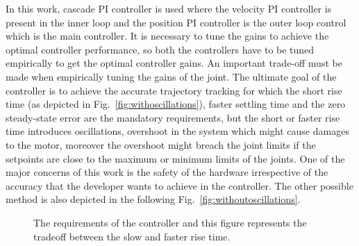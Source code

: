 In this work, cascade PI controller is used where the velocity PI controller is present in the inner loop and the position PI controller is the outer loop control which is the main controller. It is necessary to tune the gains to achieve the optimal controller performance, so both the controllers have to be tuned empirically to get the optimal controller gains. An important trade-off must be made when empirically tuning the gains of the joint. The ultimate goal of the controller is to achieve the accurate trajectory tracking for which the short rise time (as depicted in Fig.~\ref{fig:withoscillations}), faster settling time and the zero steady-state error are the mandatory requirements, but the short or faster rise time introduces oscillations, overshoot in the system which might cause damages to the motor, moreover the overshoot might breach the joint limits if the setpoints are close to the maximum or minimum limits of the joints. One of the major concerns of this work is the safety of the hardware irrespective of the accuracy that the developer wants to achieve in the controller. The other possible method is also depicted in the following Fig.~\ref{fig:withoutoscillations}.  

\begin{figure}[h]
\centering     %
{}
\caption{The requirements of the controller and this figure represents the tradeoff between the slow and faster rise time.}
\end{figure}

